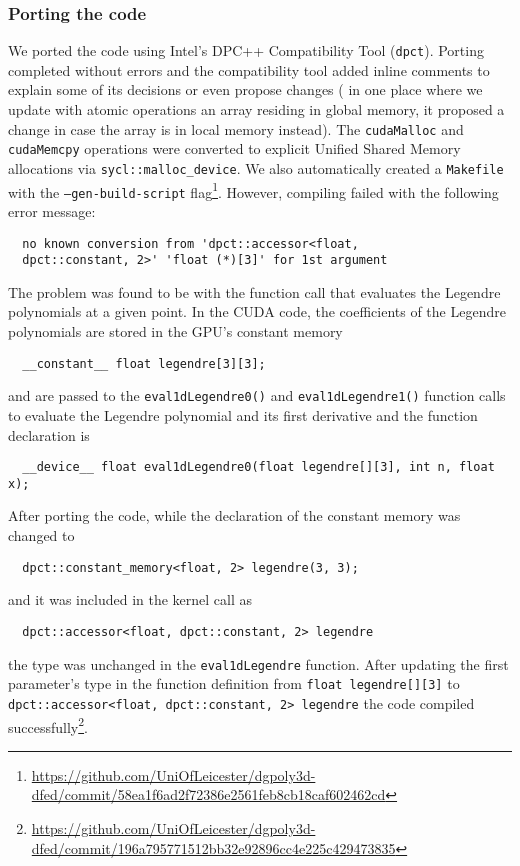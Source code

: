 \documentclass[../main]{subfiles}
\begin{document}
\subsubsection{Porting the code}\label{sec:dgpoly3d_porting}
We ported the code using Intel's DPC++ Compatibility Tool (\texttt{dpct}).
Porting completed without errors and the compatibility tool added inline comments to explain some of its decisions or even propose changes (\eg{} in one place where we update with atomic operations an array residing in global memory, it proposed a change in case the array is in local memory instead).
The \texttt{cudaMalloc} and \texttt{cudaMemcpy} operations were converted to explicit Unified Shared Memory allocations via \texttt{sycl::malloc\_device}.
We also automatically created a \texttt{Makefile} with the \texttt{--gen-build-script} flag\footnote{\url{https://github.com/UniOfLeicester/dgpoly3d-dfed/commit/58ea1f6ad2f72386e2561feb8cb18caf602462cd}}.
However, compiling failed with the following error message:
\begin{verbatim}
  no known conversion from 'dpct::accessor<float,
  dpct::constant, 2>' 'float (*)[3]' for 1st argument
\end{verbatim}
The problem was found to be with the function call that evaluates the Legendre polynomials at a given point.
In the CUDA code, the coefficients of the Legendre polynomials are stored in the GPU's constant memory
\begin{verbatim}
  __constant__ float legendre[3][3];
\end{verbatim}
and are passed to the \texttt{eval1dLegendre0()} and \texttt{eval1dLegendre1()} function calls to evaluate the Legendre polynomial and its first derivative and the function declaration is
\begin{verbatim}
  __device__ float eval1dLegendre0(float legendre[][3], int n, float x);
\end{verbatim}
After porting the code, while the declaration of the constant memory was changed to
\begin{verbatim}
  dpct::constant_memory<float, 2> legendre(3, 3);
\end{verbatim}
and it was included in the kernel call as
\begin{verbatim}
  dpct::accessor<float, dpct::constant, 2> legendre
\end{verbatim}
the type was unchanged in the \texttt{eval1dLegendre} function.
After updating the first parameter's type in the function definition  from \mbox{\texttt{\small float legendre[][3]}} to \mbox{\texttt{\small dpct::accessor<float, dpct::constant, 2> legendre}} the code compiled successfully\footnote{\url{https://github.com/UniOfLeicester/dgpoly3d-dfed/commit/196a795771512bb32e92896cc4e225c429473835}}.
\end{document}
